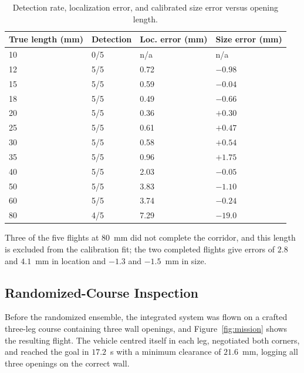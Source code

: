 \documentclass[final,5p,times]{elsarticle}
\begin{document}
\begin{table}[t]
\centering
\caption{Detection rate, localization error, and calibrated size error versus opening length.}
\label{tab:detection}
\footnotesize\setlength{\tabcolsep}{3pt}
\begin{threeparttable}
\begin{tabular*}{\columnwidth}{@{\extracolsep{\fill}}llll@{}}
\toprule
True length (mm) & Detection & Loc. error (mm) & Size error (mm) \\
\midrule
10 & 0/5 & n/a & n/a \\
12 & 5/5 & 0.72 & $-0.98$ \\
15 & 5/5 & 0.59 & $-0.04$ \\
18 & 5/5 & 0.49 & $-0.66$ \\
20 & 5/5 & 0.36 & $+0.30$ \\
25 & 5/5 & 0.61 & $+0.47$ \\
30 & 5/5 & 0.58 & $+0.54$ \\
35 & 5/5 & 0.96 & $+1.75$ \\
40 & 5/5 & 2.03 & $-0.05$ \\
50 & 5/5 & 3.83 & $-1.10$ \\
60 & 5/5 & 3.74 & $-0.24$ \\
80\tnote{a} & 4/5 & 7.29 & $-19.0$ \\
\bottomrule
\end{tabular*}
\begin{tablenotes}\footnotesize
\item[a] Three of the five flights at $80$~mm did not complete the corridor, and this length is excluded from the calibration fit; the two completed flights give errors of $2.8$ and $4.1$~mm in location and $-1.3$ and $-1.5$~mm in size.
\end{tablenotes}
\end{threeparttable}
\end{table}

\subsection{Randomized-Course Inspection}
\label{sec:results_batch}

Before the randomized ensemble, the integrated system was flown on a crafted three-leg course containing three wall openings, and Figure~\ref{fig:mission} shows the resulting flight. The vehicle centred itself in each leg, negotiated both corners, and reached the goal in $17.2$~s with a minimum clearance of $21.6$~mm, logging all three openings on the correct wall.
\end{document}
